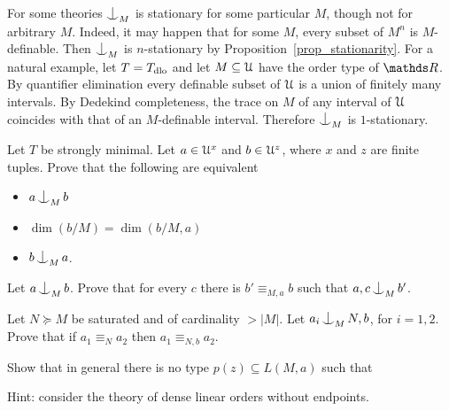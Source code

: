
\begin{remark}\label{rk_coheir_stationary}
For some theories $\nonfork_M$ is stationary for some particular $M$, though not for arbitrary $M$.
Indeed, it may happen that for some $M$, every subset of $M^n$ is $M$-definable.
Then $\nonfork_M$ is $n$-stationary by Proposition~\ref{prop_stationarity}.
For a natural example, let $T=T_{\rm dlo}$ and let $M\subseteq\EuScript U$ have the order type of $\RR$.
By quantifier elimination every definable subset of $\EuScript U$ is a union of finitely many intervals.
By Dedekind completeness, the trace on $M$ of any interval of $\EuScript U$ coincides with that of an $M$-definable interval.
Therefore $\nonfork_M$ is $1$-stationary.
\end{remark}

\begin{exercise}
  Let $T$ be strongly minimal.
  Let $a\in\EuScript U^x$ and $b\in\EuScript U^z$, where $x$ and $z$ are finite tuples.
  Prove that the following are equivalent
  \begin{itemize}
    \item[1.] $a\nonfork_M b$
    \item[2.] $\dim(b/M)=\dim(b/M,a)$
    \item[3.] $b\nonfork_M a$.
  \end{itemize}
\end{exercise}

\begin{exercise}
  Let $a\nonfork_M b$. 
  Prove that for every $c$ there is $b'\equiv_{M,a} b$ such that $a,c\nonfork_M b'$. 
\end{exercise}

\begin{exercise}
  Let $N\succeq M$ be saturated and of cardinality $>|M|$.
  Let $a_i\nonfork_M N, b$, for $i=1,2$. 
  Prove that if $a_1\equiv_N a_2$ then $a_1\equiv_{N,b} a_2$.
\end{exercise}

\begin{exercise}\label{ex_heir_coheir_counterexample}
  Show that in general there is no type $p(z)\subseteq L(M,a)$ such that 


  Hint: consider the theory of dense linear orders without endpoints.
\end{exercise}

